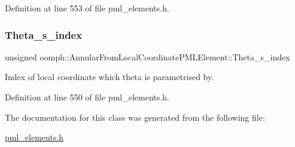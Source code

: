 Definition at line 553 of file pml\+\_\+elements.\+h.

\mbox{\label{classoomph_1_1AnnularFromLocalCoordinatePMLElement_ac4bc071b8e8c384504a4a61113ec2ecd}} 
\subsubsection{\texorpdfstring{Theta\+\_\+s\+\_\+index}{Theta\_s\_index}}
{\footnotesize\ttfamily unsigned oomph\+::\+Annular\+From\+Local\+Coordinate\+P\+M\+L\+Element\+::\+Theta\+\_\+s\+\_\+index\hspace{0.3cm}{\ttfamily [protected]}}



Index of local coordinate which theta is parametrised by. 



Definition at line 550 of file pml\+\_\+elements.\+h.



The documentation for this class was generated from the following file\+:\begin{DoxyCompactItemize}
\item 
\hyperlink{pml__elements_8h}{pml\+\_\+elements.\+h}\end{DoxyCompactItemize}
